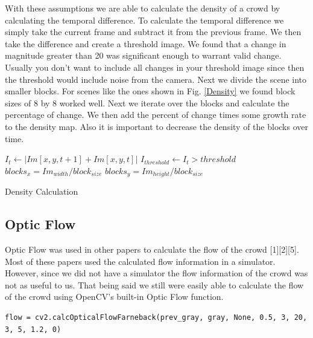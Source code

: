 \documentclass[conference]{IEEEtran}
\begin{document}
With these assumptions we are able to calculate the density of a crowd by calculating the temporal difference. To calculate the temporal difference we simply take the current frame and subtract it from the previous frame. We then take the difference and create a threshold image. We found that a change in magnitude greater than 20 was significant enough to warrant valid change. Usually you don’t want to include all changes in your threshold image since then the threshold would include noise from the camera. Next we divide the scene into smaller blocks. For scenes like the ones shown in Fig. \ref{Density} we found block sizes of 8 by 8 worked well. Next we iterate over the blocks and calculate the percentage of change. We then add the percent of change times some growth rate to the density map. Also it is important to decrease the density of the blocks over time.

\begin{algorithm}
\DontPrintSemicolon
 $I_{t} \leftarrow | Im[x, y, t+1] + Im[x, y, t] | $\;
 $I_{threshold} \leftarrow I_{t} > threshold$\;
 $blocks_{x} = Im_{width}/block_{size}$\;
 $blocks_{y} = Im_{height}/block_{size}$\;
\caption{Density Calculation}
\end{algorithm}

\subsection{Optic Flow}

Optic Flow was used in other papers to calculate the flow of the crowd [1][2][5]. Most of these papers used the calculated flow information in a simulator. However, since we did not have a simulator the flow information of the crowd was not as useful to us. That being said we still were easily able to calculate the flow of the crowd using OpenCV’s built-in Optic Flow function.

\begin{lstlisting}
flow = cv2.calcOpticalFlowFarneback(prev_gray, gray, None, 0.5, 3, 20, 3, 5, 1.2, 0)
\end{lstlisting}
\end{document}
